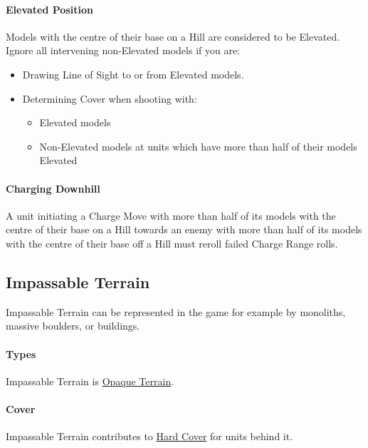 \paragraph{Elevated Position}

Models with the centre of their base on a Hill are considered to be Elevated. Ignore all intervening non-Elevated models if you are:
\begin{itemize}
	\item Drawing Line of Sight to or from Elevated models.
	\item Determining Cover when shooting with:
	\begin{itemize}
		\item Elevated models
		\item Non-Elevated models at units which have more than half of their models Elevated
	\end{itemize}
\end{itemize}

\paragraph{Charging Downhill}

A unit initiating a Charge Move with more than half of its models with the centre of their base on a Hill towards an enemy with more than half of its models with the centre of their base off a Hill must reroll failed Charge Range rolls.

\subsection{Impassable Terrain}
\label{impassable_terrain}

Impassable Terrain can be represented in the game for example by monoliths, massive boulders, or buildings.

\paragraph{ Types}

Impassable Terrain is \hyperref[opaque_terrain]{Opaque Terrain}.%

\paragraph{Cover}

Impassable Terrain contributes to \hyperref[covering_terrain]{Hard Cover} for units behind it.

